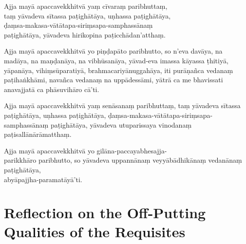 \begin{leader}
\end{leader}



Ajja mayā apaccavekkhitvā yaṃ cīvaraṃ paribhuttaṃ,\\
taṃ yāvadeva sītassa paṭighātāya, uṇhassa paṭighātāya,\\
ḍaṃsa-makasa-vātātapa-siriṃsapa-samphassānaṃ\\
paṭighātāya, yāvadeva hirikopina paṭicchādan'atthaṃ.

Ajja mayā apaccavekkhitvā yo piṇḍapāto paribhutto, so n'eva davāya, na madāya, na
maṇḍanāya, na vibhūsanāya, yāvad-eva imassa kāyassa ṭhitiyā, yāpanāya,
vihiṃsūparatiyā, brahmacariyānuggahāya, iti purāṇañca vedanaṃ paṭihaṅkhāmi,
navañca vedanaṃ na uppādessāmi, yātrā ca me bhavissati anavajjatā ca
phāsuvihāro cā'ti.

Ajja mayā apaccavekkhitvā yaṃ senāsanaṃ paribhuttaṃ, taṃ yāvadeva sītassa
paṭighātāya, uṇhassa paṭighātāya, ḍaṃsa-makasa-vātātapa-siriṃsapa-samphassānaṃ
paṭighātāya, yāvadeva utuparissaya vinodanaṃ paṭisallānārāmatthaṃ.

Ajja mayā apaccavekkhitvā yo gilāna-paccayabhesajja-\\ parikkhāro paribhutto, so
yāvadeva uppannānaṃ veyyābādhikānaṃ vedanānaṃ paṭighātāya,\\
abyāpajjha-paramatāyā'ti. 


\section[Reflection on the Off-Putting Qualities]{Reflection on the Off-Putting Qualities of the Requisites}

\begin{leader}
\end{leader}


